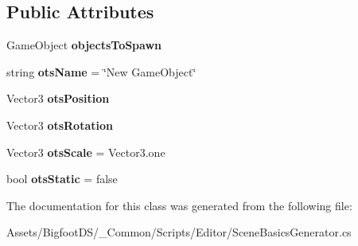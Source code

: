 \subsection*{Public Attributes}
\begin{DoxyCompactItemize}
\item 
\mbox{\label{class_bigfoot_d_s_1_1_scene_basics_generator_a977290e611b430b3f8d18ad39dd2d63c}} 
Game\+Object {\bfseries objects\+To\+Spawn}
\item 
\mbox{\label{class_bigfoot_d_s_1_1_scene_basics_generator_aa1738e0af674139eb8956e3d4796c665}} 
string {\bfseries ots\+Name} = \char`\"{}New Game\+Object\char`\"{}
\item 
\mbox{\label{class_bigfoot_d_s_1_1_scene_basics_generator_a75a4abac9fa3686c027eae78527e880d}} 
Vector3 {\bfseries ots\+Position}
\item 
\mbox{\label{class_bigfoot_d_s_1_1_scene_basics_generator_af61d510b4d0620532443d89c21d96ebb}} 
Vector3 {\bfseries ots\+Rotation}
\item 
\mbox{\label{class_bigfoot_d_s_1_1_scene_basics_generator_a6fcfb33b239e0245687faaac690ccc66}} 
Vector3 {\bfseries ots\+Scale} = Vector3.\+one
\item 
\mbox{\label{class_bigfoot_d_s_1_1_scene_basics_generator_a617e074c4a03c936ff9c8fc9110c1adc}} 
bool {\bfseries ots\+Static} = false
\end{DoxyCompactItemize}


The documentation for this class was generated from the following file\+:\begin{DoxyCompactItemize}
\item 
Assets/\+Bigfoot\+D\+S/\+\_\+\+Common/\+Scripts/\+Editor/Scene\+Basics\+Generator.\+cs\end{DoxyCompactItemize}
